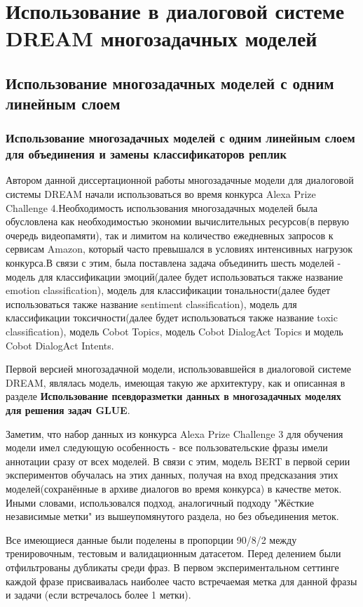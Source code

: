   \chapter{  Использование в диалоговой системе DREAM многозадачных моделей}\label{ch:mtldream} 

\section{Использование многозадачных моделей с одним линейным слоем }
\subsection{Использование многозадачных моделей с одним линейным слоем для объединения и замены классификаторов реплик}
Автором данной диссертационной работы многозадачные модели для диалоговой системы DREAM начали использоваться во время конкурса Alexa Prize Challenge 4.Необходимость использования многозадачных моделей была обусловлена как необходимостью экономии вычислительных ресурсов(в первую очередь видеопамяти),
так и лимитом на количество ежедневных запросов к сервисам Amazon, который часто превышался в условиях интенсивных нагрузок конкурса.В связи с этим, была поставлена задача объединить шесть моделей - модель для классификации эмоций(далее будет использоваться также название emotion classification), модель для классификации тональности(далее будет использоваться также название sentiment classification), модель для классификации токсичности(далее будет использоваться также название toxic classification), модель Cobot Topics, модель Cobot DialogAct Topics и модель Cobot DialogAct Intents. 

Первой версией многозадачной модели, использовавшейся в диалоговой системе DREAM, являлась модель, имеющая такую же архитектуру,
как и описанная в разделе \textbf{Использование псевдоразметки данных в многозадачных моделях для решения задач GLUE}.

 Заметим, что набор данных из конкурса Alexa Prize Challenge 3 для обучения модели имел следующую особенность - все пользовательские фразы имели аннотации сразу от всех моделей. В связи с этим, модель BERT в первой серии экспериментов обучалась на этих данных, получая на вход предсказания этих моделей(сохранённые в архиве диалогов во время конкурса) в качестве меток. Иными словами, использовался подход, аналогичный подходу "Жёсткие независимые метки" из вышеупомянутого раздела, но без объединения меток. 
 
Все имеющиеся данные были поделены в пропорции 90/8/2 между тренировочным, тестовым и валидационным датасетом. Перед делением были отфильтрованы дубликаты среди фраз. В первом экспериментальном сеттинге каждой фразе присваивалась наиболее часто встречаемая метка для данной фразы и задачи (если встречалось более 1 метки). 


